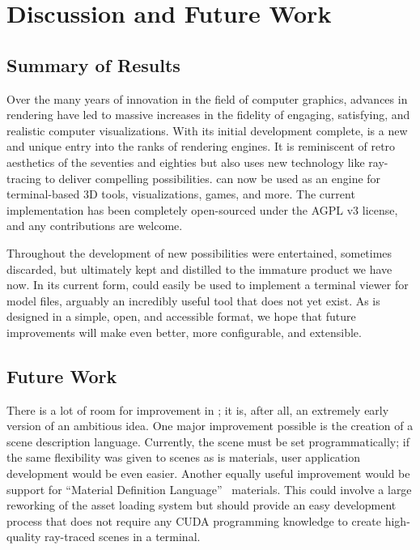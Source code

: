 %
%
%

\chapter{Discussion and Future Work}\label{ch:conclusion}

\section{Summary of Results}\label{ch:conclusion:summary}

Over the many years of innovation in the field of computer graphics, advances in rendering have led to massive increases in the fidelity of engaging, satisfying, and realistic computer visualizations.
With its initial development complete, \name{} is a new and unique entry into the ranks of rendering engines.
It is reminiscent of retro aesthetics of the seventies and eighties but also uses new technology like ray-tracing to deliver compelling possibilities.
\name{} can now be used as an engine for terminal-based 3D tools, visualizations, games, and more.
The current implementation has been completely open-sourced under the AGPL v3 license, and any contributions are welcome.

Throughout the development of \name{} new possibilities were entertained, sometimes discarded, but ultimately kept and distilled to the immature product we have now.
In its current form, \name{} could easily be used to implement a terminal viewer for model files, arguably an incredibly useful tool that does not yet exist.
As \name{} is designed in a simple, open, and accessible format, we hope that future improvements will make \name{} even better, more configurable, and extensible.

\section{Future Work}\label{ch:conclusion:future}

There is a lot of room for improvement in \name{}; it is, after all, an extremely early version of an ambitious idea.
One major improvement possible is the creation of a scene description language.
Currently, the scene must be set programmatically; if the same flexibility was given to scenes as is materials, user application development would be even easier.
Another equally useful improvement would be support for ``Material Definition Language''~\cite{nvidia2015mdl} materials.
This could involve a large reworking of the asset loading system but should provide an easy development process that does not require any CUDA programming knowledge to create high-quality ray-traced scenes in a terminal.

